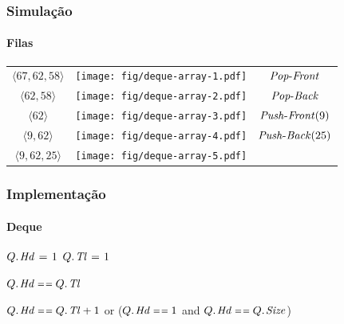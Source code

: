 \documentclass{beamer}
\begin{document}
\begin{frame}
  \frametitle{Simulação}
  \framesubtitle{Filas}

  \begin{center}
    \begin{tabular}{ccc}
      $\langle 67, 62, 58 \rangle$ &
      \texttt{[image: fig/deque-array-1.pdf]}
      \pause
      &
      $\id{Pop-Front}$ \pause
      \\
      $\langle 62, 58 \rangle$ &
      \texttt{[image: fig/deque-array-2.pdf]}
      \pause
      &
      $\id{Pop-Back}$ \pause
      \\
      $\langle 62 \rangle$ &
      \texttt{[image: fig/deque-array-3.pdf]}
      \pause
      &
      $\id{Push-Front}(9)$ \pause
      \\
      $\langle 9, 62 \rangle$ &
      \texttt{[image: fig/deque-array-4.pdf]}
      &
      $\id{Push-Back}(25)$ \pause
      \\
      $\langle 9, 62, 25 \rangle$ &
      \texttt{[image: fig/deque-array-5.pdf]}
      &
    \end{tabular}
  \end{center}

\end{frame}

\begin{frame}

  \frametitle{Implementação}
  \framesubtitle{Deque}

\begin{codebox}
\li $\attrib{Q}{Hd} \gets 1$
\li $\attrib{Q}{Tl} \gets 1$
\end{codebox}
\begin{codebox}
\li  \Return $\attrib{Q}{Hd} \isequal \attrib{Q}{Tl}$
\end{codebox}
\begin{codebox}
\li  \Return $\attrib{Q}{Hd} \isequal \attrib{Q}{Tl} + 1$ or
\li  \> ($\attrib{Q}{Hd} \isequal 1$ and $\attrib{Q}{Hd} \isequal \attrib{Q}{Size}$)
\end{codebox}

\end{frame}
\end{document}
